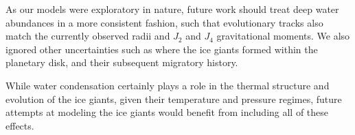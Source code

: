 \documentclass[11pt]{ucscthesisbs}
\begin{document}
As our models were exploratory in nature, future work should treat deep water abundances in a more consistent fashion, such that evolutionary tracks also match the currently observed radii and $J_{2}$ and $J_{4}$ gravitational moments. We also ignored other uncertainties such as where the ice giants formed within the planetary disk, and their subsequent migratory history.

While water condensation certainly plays a role in the thermal structure and evolution of the ice giants, given their temperature and pressure regimes, future attempts at modeling the ice giants would benefit from including all of these effects.
 

\newcommand{\newblock}{}

 
\end{document}
